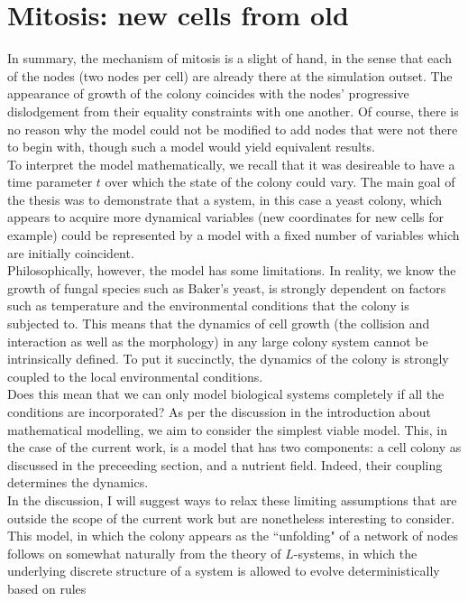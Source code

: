 \section{Mitosis: new cells from old}
In summary, the mechanism of mitosis is a slight of hand, in the sense that
each of the nodes (two nodes per cell) are already there at the simulation
outset. The appearance of growth of the colony coincides with the nodes' progressive
dislodgement from their equality constraints with one another. Of course,
there is no reason why the model could not be modified to add nodes
that were not there to begin with, though such a model would yield
equivalent results.
\\
To interpret the model mathematically, we recall that it was desireable to have
a time parameter $t$ over which the state of the colony could vary. The main 
goal of the thesis was to demonstrate that a system, in this case a yeast colony,
which appears to acquire more dynamical variables (new coordinates for new cells for example)
could be represented by a model with a fixed number of variables which are
initially coincident.
\\
Philosophically, however, the model has some limitations. In reality, we know the growth
of fungal species such as Baker's yeast, is strongly dependent on factors such as temperature
and the environmental conditions that the colony is subjected to. This means 
that the dynamics of cell growth (the collision and interaction as well as the morphology) in 
any large colony system cannot be intrinsically defined. To put it succinctly, the dynamics of 
the colony is strongly coupled to the local environmental conditions.
\\
Does this mean that we can only model biological systems completely if all the conditions 
are incorporated? As per the discussion in the introduction about mathematical modelling,
we aim to consider the simplest viable model. This, in the case of the current work, 
is a model that has two components: a cell colony as discussed in the preceeding section, and 
a nutrient field. Indeed, their coupling determines the dynamics. 
\\
In the discussion, I will suggest ways to relax these limiting assumptions that
are outside the scope of the current work but are nonetheless interesting to consider.
\\
This model, in which the colony appears as the ``unfolding" of a network of nodes
follows on somewhat naturally from the theory of $L$-systems, in which the underlying 
discrete structure of a system is allowed to evolve deterministically based on rules
